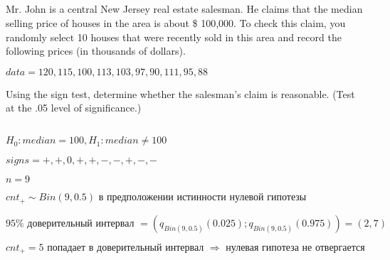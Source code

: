 \documentclass[13pt,a4paper]{scrartcl}
\begin{document}
\subsection*{\allowbreak }

Mr. John is a central New Jersey real estate salesman. He claims that the
median selling price of houses in the area is about \$ 100,000. To check this
claim, you randomly select 10 houses that were recently sold in this area and
record the following prices (in thousands of dollars).

\(data = 120, 115, 100, 113, 103, 97, 90, 111, 95, 88\)

Using the sign test, determine whether the salesman’s claim is reasonable.
(Test at the .05 level of significance.)

\subsection*{\allowbreak }

\(H_0: median = 100, H_1: median \neq  100\)

\(signs = +, +, 0, +, +, -, -, +, -, -\)

\(n = 9\)

\(cnt_+ \sim  Bin(9, 0.5)\text{ в }\allowbreak \text{предположении }\allowbreak \text{истинности }\allowbreak \text{нулевой }\allowbreak \text{гипотезы}\allowbreak \)

\(95\%\text{ доверительный }\allowbreak \text{интервал }\allowbreak = (q_{Bin(9, 0.5)}(0.025); q_{Bin(9, 0.5)}(0.975)) = (2, 7)\)

\(cnt_+ = 5\text{ попадает }\allowbreak \text{в }\allowbreak \text{доверительный }\allowbreak \text{интервал }\allowbreak \Rightarrow \text{ нулевая }\allowbreak \text{гипотеза }\allowbreak \text{не }\allowbreak \text{отвергается}\allowbreak \)
\end{document}
